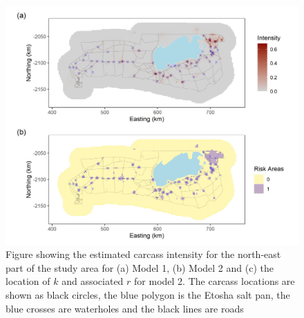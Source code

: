\documentclass[letterpaper, 12pt]{interact}
\begin{document}
	\begin{figure}[!ht]
		\centering
		\includegraphics[width=\linewidth]{images/Figure9.jpg}
		\caption{Figure showing the estimated carcass intensity for the north-east part of the study area for (a) Model 1, (b) Model 2 and (c) the location of $k$ and associated $r$ for model 2. The carcass locations are shown as black circles, the blue polygon is the Etosha salt pan, the blue crosses are waterholes and the black lines are roads}
		\label{fig:zoomplots}
	\end{figure}
	
	
\end{document}
